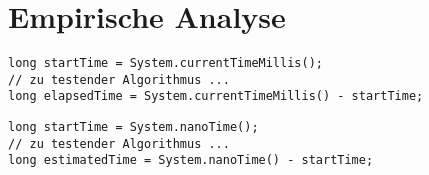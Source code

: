 \newpage
\section{Empirische Analyse}
\begin{lstlisting}
long startTime = System.currentTimeMillis();
// zu testender Algorithmus ...
long elapsedTime = System.currentTimeMillis() - startTime;   
\end{lstlisting}

\begin{lstlisting}
long startTime = System.nanoTime();
// zu testender Algorithmus ...
long estimatedTime = System.nanoTime() - startTime;
\end{lstlisting}
